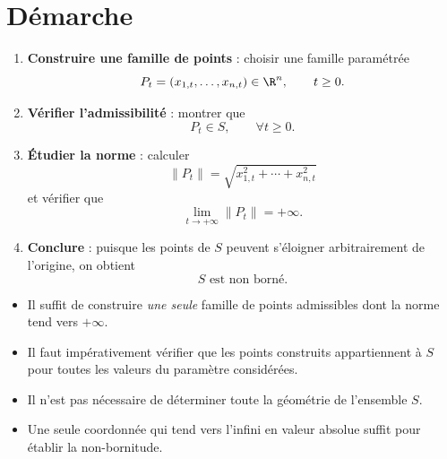 
\section{Démarche}

\begin{methode}
\begin{enumerate}[label=\textbf{Étape \arabic*.}]
    \item \textbf{Construire une famille de points} : choisir une famille paramétrée
    \[
    P_t=(x_{1,t},\ldots,x_{n,t})\in\R^n,
    \qquad t\geq 0.
    \]

    \item \textbf{Vérifier l'admissibilité} : montrer que
    \[
    P_t\in S,\qquad \forall t\geq 0.
    \]

    \item \textbf{Étudier la norme} : calculer
    \[
    \|P_t\|=\sqrt{x_{1,t}^2+\cdots+x_{n,t}^2}
    \]
    et vérifier que
    \[
    \lim_{t\to+\infty}\|P_t\|=+\infty.
    \]

    \item \textbf{Conclure} : puisque les points de $S$ peuvent s'éloigner arbitrairement de l'origine, on obtient
    \[
    \boxed{S\text{ est non borné}.}
    \]
\end{enumerate}
\end{methode}

\begin{attention}
\begin{itemize}
    \item Il suffit de construire \emph{une seule} famille de points admissibles dont la norme tend vers $+\infty$.
    \item Il faut impérativement vérifier que les points construits appartiennent à $S$ pour toutes les valeurs du paramètre considérées.
    \item Il n'est pas nécessaire de déterminer toute la géométrie de l'ensemble $S$.
    \item Une seule coordonnée qui tend vers l'infini en valeur absolue suffit pour établir la non-bornitude.
\end{itemize}
\end{attention}

